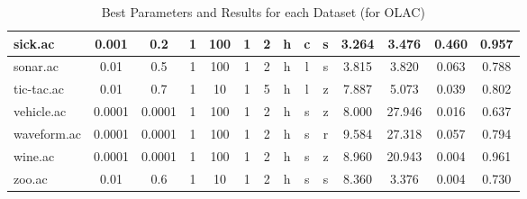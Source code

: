 \begin{table}[htbp]
\begin{tabular}{|l|c|c|c|c|c|c|c|c|c||c|c|c|c|}
		\hline
		sick.ac        & 0.001    & 0.2         & 1              & 100                 & 1             & 2             & h      & c        & s        & 3.264          & 3.476          & 0.460          & 0.957          \\
		\hline
		sonar.ac       & 0.01     & 0.5         & 1              & 100                 & 1             & 2             & h      & l        & s        & 3.815          & 3.820          & 0.063          & 0.788          \\
		\hline
		tic-tac.ac     & 0.01     & 0.7         & 1              & 10                  & 1             & 5             & h      & l        & z        & 7.887          & 5.073          & 0.039          & 0.802          \\
		\hline
		vehicle.ac     & 0.0001   & 0.0001      & 1              & 100                 & 1             & 2             & h      & s        & z        & 8.000          & 27.946         & 0.016          & 0.637          \\
		\hline
		waveform.ac    & 0.0001   & 0.0001      & 1              & 100                 & 1             & 2             & h      & s        & r        & 9.584          & 27.318         & 0.057          & 0.794          \\
		\hline
		wine.ac        & 0.0001   & 0.0001      & 1              & 100                 & 1             & 2             & h      & s        & z        & 8.960          & 20.943         & 0.004          & 0.961          \\
		\hline
		zoo.ac         & 0.01     & 0.6         & 1              & 10                  & 1             & 2             & h      & s        & s        & 8.360          & 3.376          & 0.004          & 0.730          \\
		\hline
		\end{tabular}
	\caption{Best Parameters and Results for each Dataset (for OLAC)}
	\label{tab:best_runs_for_each_db_olac}
\end{table}